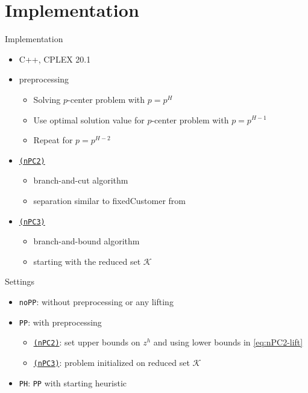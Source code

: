 \documentclass[utf8,aspectratio=169,ngerman,english]{beamer}
\renewcommand{\emph}[1]{\textcolor{jkuGreen}{#1}}
\newcommand{\nPCE}{\hyperref[eq:nPCE]{\texttt{(nPC3)}}\xspace}
\newcommand{\nPCY}{\hyperref[eq:nPCY]{\texttt{(nPC2)}}\xspace}
\newcommand{\noPP}{\texttt{noPP}\xspace}
\newcommand{\PP}{\texttt{PP}\xspace}
\newcommand{\sH}{\texttt{PH}\xspace}
\begin{document}
\section{Implementation}
\begin{frame}{Implementation}
    \begin{itemize}
        \item \emph{C++, CPLEX} 20.1 \pause
        \item \emph{preprocessing} \pause
        \begin{itemize}
            \item Solving \emph{$p$-center problem} with $p = p^H$
            \item Use optimal solution value for \emph{$p$-center problem} with $p = p^{H-1}$
            \item Repeat for $p = p^{H-2}$
        \end{itemize}
        \item \nPCY \pause
        \begin{itemize}
            \item \emph{branch-and-cut} algorithm
            \item separation similar to \emph{fixedCustomer} from \cite{GAAR2022}
        \end{itemize} \pause
        \item \nPCE \pause
        \begin{itemize}
            \item \emph{branch-and-bound} algorithm
            \item starting with the \emph{reduced} set $\mathcal{K}$
        \end{itemize}
    \end{itemize}
\end{frame}
\begin{frame}{Settings}
    \begin{itemize}
        \setlength\itemsep{1em}
            \item \noPP: without \emph{preprocessing} or any \emph{lifting} \pause
            \item \PP: with \emph{preprocessing} \pause
            \begin{itemize}
                \item \nPCY: set upper bounds on $z^h$ and using lower bounds in \eqref{eq:nPC2-lift}
                \item \nPCE: problem initialized on reduced set $\mathcal{K}$ 
            \end{itemize}\pause
            \item \sH: \PP with \emph{starting heuristic}
    \end{itemize}
\end{frame}
\end{document}
